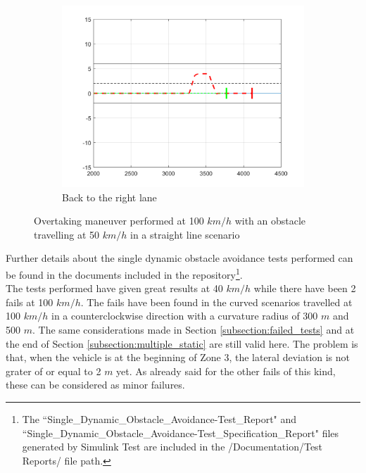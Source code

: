 \begin{figure}[H]
    \begin{subfigure}{.33\textwidth}
    \centering
    \includegraphics[width=1.1\textwidth,keepaspectratio]{Figures/overtake_single_dynamic_right.png}
    \caption{Back to the right lane}
    \label{subfig:single_right}
    \end{subfigure}
    \caption{Overtaking maneuver performed at 100 $km/h$ with an obstacle travelling at 50 $km/h$ in a straight line scenario}
    \label{fig:single_dynamic_obstacle_avoidance}
\end{figure}

Further details about the single dynamic obstacle avoidance tests performed can be found in the documents included in the repository\footnote{The ``Single\_Dynamic\_Obstacle\_Avoidance-Test\_Report" and ``Single\_Dynamic\_Obstacle\_Avoidance-Test\_Specification\_Report" files generated by Simulink Test are included in the /Documentation/Test Reports/ file path.}.\\

The tests performed have given great results at 40 $km/h$ while there have been 2 fails at 100 $km/h$. The fails have been found in the curved scenarios travelled at 100 $km/h$ in a counterclockwise direction with a curvature radius of 300 $m$ and 500 $m$. The same considerations made in Section \ref{subsection:failed_tests} and at the end of Section \ref{subsection:multiple_static} are still valid here. The problem is that, when the vehicle is at the beginning of Zone 3, the lateral deviation is not grater of or equal to 2 $m$ yet. As already said for the other fails of this kind, these can be considered as minor failures.

